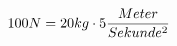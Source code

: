 \documentclass[preview]{standalone}
\begin{document}
\begin{align*}
\special{dvisvgm:raw <g id='unique000'>}100N = 20kg \cdot 5 \frac{Meter}{Sekunde^{2}}\special{dvisvgm:raw </g>}
\end{align*}
\end{document}
